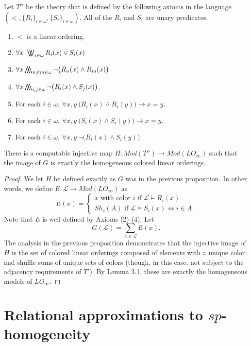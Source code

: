 \documentclass[11pt]{amsart}
\theoremstyle{definition}
\newcommand{\bigwwedge}{%
  \mathop{
    \mathchoice{\bigwedge\mkern-15mu\bigwedge}
               {\bigwedge\mkern-12.5mu\bigwedge}
               {\bigwedge\mkern-12.5mu\bigwedge}
               {\bigwedge\mkern-11mu\bigwedge}
    }
}
\newcommand{\bigvvee}{%
  \mathop{
    \mathchoice{\bigvee\mkern-15mu\bigvee}
               {\bigvee\mkern-12.5mu\bigvee}
               {\bigvee\mkern-12.5mu\bigvee}
               {\bigvee\mkern-11mu\bigvee}
    }
}
\def\L{\mathcal L}
\begin{document}
\begin{corollary}
      Let $T''$ be the theory that is defined by the following axioms in the language $(<,\{R_i\}_{i\in\omega},\{S_i\}_{i\in\omega})$. All of the $R_i$ and $S_i$ are unary predicates.
    \begin{enumerate}
        \item $<$ is a linear ordering.
        \item $\forall x ~ \bigvvee_{i\in\omega} R_i(x)\lor S_i(x)$
        \item $\forall x \bigwwedge_{n\neq m\in\omega} \lnot\big(R_n(x) \land R_m(x)\big)$
        \item $\forall x \bigwwedge_{i,j\in\omega} \lnot\big(R_i(x) \land S_j(x)\big)$.
        \item For each $i\in\omega$, $\forall x,y ~ \big(R_i(x)\land R_i(y)\big)\to x=y$.
        \item For each $i\in\omega$, $\forall x,y ~ \big(S_i(x)\land S_i(y)\big)\to x=y$.
        \item For each $i\in\omega$, $\forall x,y ~ \lnot\big( R_i(x)\land S_i(y)\big)$.
    \end{enumerate}
    There is a computable injective map $H:Mod(T'')\to Mod(LO_\infty)$ such that the image of $G$ is exactly the homogeneous colored linear orderings. 
\end{corollary}

\begin{proof}
    We let $H$ be defined exactly as $G$ was in the previous proposition.
    In other words, we define $E:\L\to Mod(LO_\infty)$ as
    \[ E(x) = \begin{cases}
        x \text{ with color } i \text{ if } \L\models R_i(x) \\
        Sh_c(A) \text{ if } \L\models S_i(x) \iff i\in A.
    \end{cases}\]
    Note that $E$ is well-defined by Axioms (2)-(4).
    Let
    \[G(\L)= \sum_{x\in\L}E(x).\]
    The analysis in the previous proposition demonstrates that the injective image of $H$ is the set of colored linear orderings composed of elements with a unique color and shuffle sums of unique sets of colors (though, in this case, not subject to the adjacency requirements of $T'$).
    By \cite{ST08} Lemma 3.1, these are exactly the homogeneous models of $LO_\infty$.
\end{proof}

\section{Relational approximations to $sp$-homogeneity}
\end{document}
